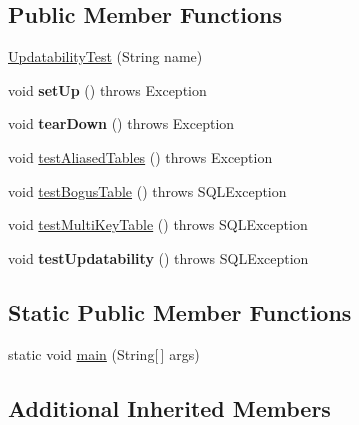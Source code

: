 \subsection*{Public Member Functions}
\begin{DoxyCompactItemize}
\item 
\mbox{\hyperlink{classtestsuite_1_1simple_1_1_updatability_test_a1ab7fd0482bf8c6fb2eec2e0bbc2be23}{Updatability\+Test}} (String name)
\item 
\mbox{\label{classtestsuite_1_1simple_1_1_updatability_test_ad7b2d9338b6097dd1b03e99015426f7d}} 
void {\bfseries set\+Up} ()  throws Exception 
\item 
\mbox{\label{classtestsuite_1_1simple_1_1_updatability_test_add9fa62db68ba414b064d6f89a0cfa6d}} 
void {\bfseries tear\+Down} ()  throws Exception 
\item 
void \mbox{\hyperlink{classtestsuite_1_1simple_1_1_updatability_test_a711d84fccc5379fc8389127a54893e15}{test\+Aliased\+Tables}} ()  throws Exception 
\item 
void \mbox{\hyperlink{classtestsuite_1_1simple_1_1_updatability_test_ac636788ee577887fe30ac0119eaba824}{test\+Bogus\+Table}} ()  throws S\+Q\+L\+Exception 
\item 
void \mbox{\hyperlink{classtestsuite_1_1simple_1_1_updatability_test_a689afecd2b1890b04a4c7b3a34fba460}{test\+Multi\+Key\+Table}} ()  throws S\+Q\+L\+Exception 
\item 
\mbox{\label{classtestsuite_1_1simple_1_1_updatability_test_ab12c72b9cf7dfb5229204bd6bb482c4c}} 
void {\bfseries test\+Updatability} ()  throws S\+Q\+L\+Exception 
\end{DoxyCompactItemize}
\subsection*{Static Public Member Functions}
\begin{DoxyCompactItemize}
\item 
static void \mbox{\hyperlink{classtestsuite_1_1simple_1_1_updatability_test_aad2ca9a47cb41ccfdc8cf82a2335e1d0}{main}} (String\mbox{[}$\,$\mbox{]} args)
\end{DoxyCompactItemize}
\subsection*{Additional Inherited Members}


